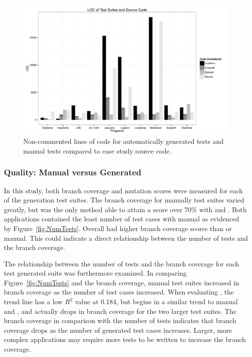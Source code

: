 


\begin{figure}[!t]
\centering
  \includegraphics[scale=0.5]{RGraphs/LOC.pdf}
    \caption{Non-commented lines of code for automatically generated tests and manual tests compared to case study source code. }
  \label{fig:LOC}
\end{figure}


\subsubsection{Quality: Manual versus Generated}
In this study, both branch coverage and mutation scores were measured for each of the generation test suites. The branch coverage for manually test suites varied greatly, but was the only method  able to attain a score over 70\% with \lavalamp and \xisemele. Both applications contained the least number of test cases with manual as evidenced by  Figure~\ref{fig:NumTests}. Overall \codepro had higher branch coverage scores than \evo or manual. This could indicate a direct relationship between the number of tests and the branch coverage. 

The relationship between the number of tests and the branch coverage for each test generated suite was furthermore examined. In comparing Figure~\ref{fig:NumTests} and the branch coverage, manual test suites increased in branch coverage as the number of test cases increased. When evaluating \evo, the trend line has a low  $R^2$ value at 0.184, but begins in a similar trend to manual and \codepro, and actually drops in branch coverage for the two larger test suites. The branch coverage in comparison with the number of tests indicates that \codepro branch coverage drops as the number of generated test cases increases. Larger, more complex applications may require more tests to be written to increase the branch coverage. 

